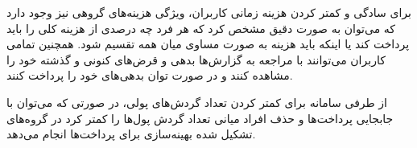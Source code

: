 برای سادگی و کمتر کردن هزینه زمانی کاربران، ویژگی هزینه‌های گروهی نیز وجود دارد که می‌توان به صورت دقیق مشخص کرد که هر فرد چه درصدی از هزینه کلی را باید پرداخت کند یا اینکه باید هزینه به صورت مساوی میان همه تقسیم شود. همچنین تمامی کاربران می‌توانند با مراجعه به گزارش‌ها بدهی و قرض‌های کنونی و گذشته خود را مشاهده کنند و در صورت توان بدهی‌های خود را پرداخت کنند.

از طرفی سامانه برای کمتر کردن تعداد گردش‌های پولی، در صورتی که می‌توان با جابجایی پرداخت‌ها و حذف افراد میانی تعداد گردش پول‌ها را کمتر کرد در گروه‌های تشکیل شده بهینه‌سازی برای پرداخت‌ها انجام می‌دهد.




%
%
%
%
%
%
%
%
%
%
%
